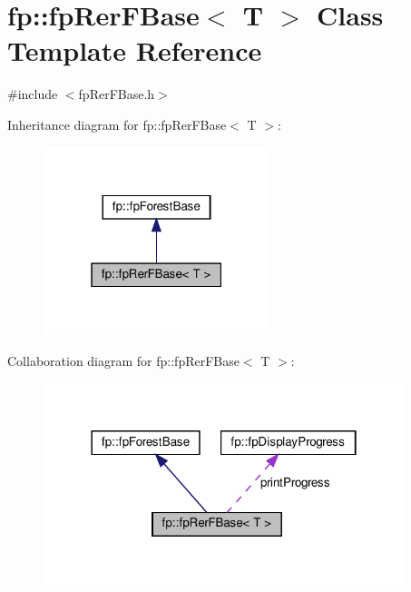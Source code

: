 \hypertarget{classfp_1_1fpRerFBase}{}\section{fp\+:\+:fp\+Rer\+F\+Base$<$ T $>$ Class Template Reference}
\label{classfp_1_1fpRerFBase}


{\ttfamily \#include $<$fp\+Rer\+F\+Base.\+h$>$}



Inheritance diagram for fp\+:\+:fp\+Rer\+F\+Base$<$ T $>$\+:
\nopagebreak
\begin{figure}[H]
\begin{center}
\leavevmode
\includegraphics[width=187pt]{classfp_1_1fpRerFBase__inherit__graph}
\end{center}
\end{figure}


Collaboration diagram for fp\+:\+:fp\+Rer\+F\+Base$<$ T $>$\+:
\nopagebreak
\begin{figure}[H]
\begin{center}
\leavevmode
\includegraphics[width=298pt]{classfp_1_1fpRerFBase__coll__graph}
\end{center}
\end{figure}
